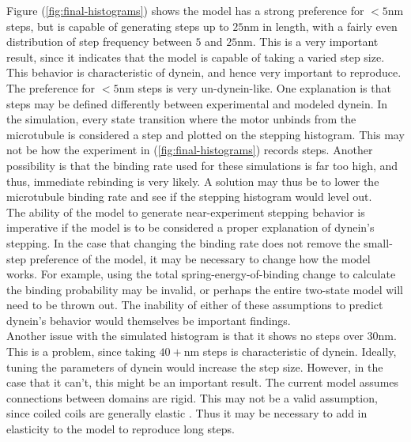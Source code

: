 \documentclass[
11pt, %
english, %
singlespacing, %
headsepline, %
chapterinoneline, %
]{MastersDoctoralThesis} %
\begin{document}
Figure (\ref{fig:final-histograms}) shows the model has a strong preference for $<5$nm steps, but is capable of generating steps up to $25$nm in length, with a fairly even distribution of step frequency between $5$ and $25$nm. This is a very important result, since it indicates that the model is capable of taking a varied step size. This behavior is characteristic of dynein, and hence very important to reproduce.\\

The preference for $<5$nm steps is very un-dynein-like. One explanation is that steps may be defined differently between experimental and modeled dynein. In the simulation, every state transition where the motor unbinds from the microtubule is considered a step and plotted on the stepping histogram. This may not be how the experiment in (\ref{fig:final-histograms}) records steps. Another possibility is that the binding rate used for these simulations is far too high, and thus, immediate rebinding is very likely. A solution may thus be to lower the microtubule binding rate and see if the stepping histogram would level out.\\

The ability of the model to generate near-experiment stepping behavior is imperative if the model is to be considered a proper explanation of dynein's stepping. In the case that changing the binding rate does not remove the small-step preference of the model, it may be necessary to change how the model works. For example, using the total spring-energy-of-binding change to calculate the binding probability may be invalid, or perhaps the entire two-state model will need to be thrown out. The inability of either of these assumptions to predict dynein's behavior would themselves be important findings.\\

Another issue with the simulated histogram is that it shows no steps over $30$nm. This is a problem, since taking $40+$nm steps is characteristic of dynein. Ideally, tuning the parameters of dynein would increase the step size. However, in the case that it can't, this might be an important result. The current model assumes connections between domains are rigid. This may not be a valid assumption, since coiled coils are generally elastic \cite{myosin-cc-elasticity}. Thus it may be necessary to add in elasticity to the model to reproduce long steps.\\
\end{document}

